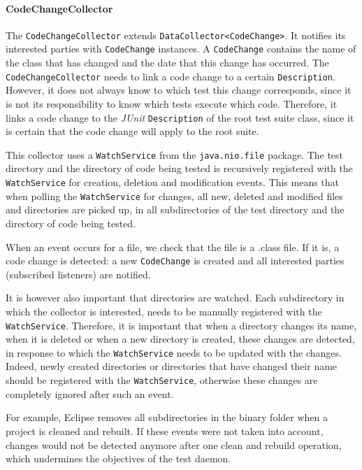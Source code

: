 \documentclass[i2]{oss}
\newcommand{\class}[1]{\texttt{#1}}
\newcommand{\junit}{\emph{JUnit }}
\begin{document}


\paragraph{CodeChangeCollector}

The \class{CodeChangeCollector} extends \class{DataCollector<CodeChange>}.
It notifies its interested parties with \class{CodeChange} instances.
A \class{CodeChange} contains the name of the class that has changed and the date that this change has occurred.
The \class{CodeChangeCollector} needs to link a code change to a certain \class{Description}.
However, it does not always know to which test this change corresponds, since it is not its responsibility to know which tests execute which code.
Therefore, it links a code change to the \junit \class{Description} of the root test suite class, since it is certain that the code change will apply to the root suite.

This collector uses a \class{WatchService} from the \class{java.nio.file} package.
The test directory and the directory of code being tested is recursively registered with the \class{WatchService} for creation, deletion and modification events.
This means that when polling the \class{WatchService} for changes, all new, deleted and modified files and directories are picked up, in all subdirectories of the test directory and the directory of code being tested.

When an event occurs for a file, we check that the file is a .class file.
If it is, a code change is detected: a new \class{CodeChange} is created and all interested parties (subscribed listeners) are notified.

It is however also important that directories are watched.
Each subdirectory in which the collector is interested, needs to be manually registered with the \class{WatchService}.
Therefore, it is important that when a directory changes its name, when it is deleted or when a new directory is created, these changes are detected, in response to which the \class{WatchService} needs to be updated with the changes.
Indeed, newly created directories or directories that have changed their name should be registered with the \class{WatchService}, otherwise these changes are completely ignored after such an event.

For example, Eclipse removes all subdirectories in the binary folder when a project is cleaned and rebuilt. If these events were not taken into account, changes would not be detected anymore after one clean and rebuild operation, which undermines the objectives of the test daemon.
\end{document}
